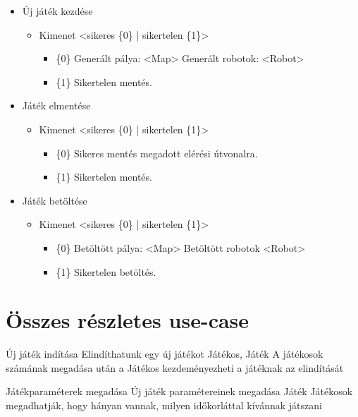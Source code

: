 \begin{itemize}
	\item Új játék kezdése
	\begin{itemize}
		\item Kimenet <sikeres \{0\} | sikertelen \{1\}>
		\begin{itemize}
			\item \{0\} Generált pálya: <Map> Generált robotok: <Robot>
			\item \{1\} Sikertelen mentés.
		\end{itemize}
	\end{itemize}
	
	
	\item Játék elmentése
	\begin{itemize}
		\item Kimenet <sikeres \{0\} | sikertelen \{1\}>
		\begin{itemize}
			\item \{0\} Sikeres mentés megadott elérési útvonalra. 
			\item \{1\} Sikertelen mentés.
		\end{itemize}
	\end{itemize}

	\item Játék betöltése
	\begin{itemize}
		\item Kimenet <sikeres \{0\} | sikertelen \{1\}>
		\begin{itemize}
			\item \{0\} Betöltött pálya: <Map> Betöltött robotok <Robot> 
			\item \{1\} Sikertelen betöltés.
		\end{itemize}
	\end{itemize}
	
\end{itemize}


\section{Összes részletes use-case}

\usecase%
{Új játék indítása}%
{Elindíthatunk egy új játékot}%
{Játékos, Játék}%
{A játékosok számának megadása után a Játékos kezdeményezheti a játéknak az elindítását}

\usecase%
{Játékparaméterek megadása}%
{Új játék paramétereinek megadása}%
{Játék}%
{Játékosok megadhatják, hogy hányan vannak, milyen időkorláttal kívánnak játszani}

